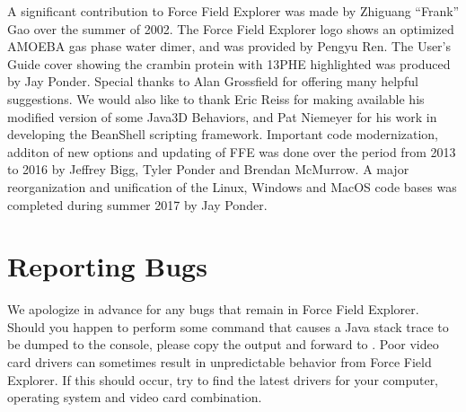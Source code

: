 \documentclass[letterpaper,11pt,english]{sphinxmanual}
\begin{document}
A significant contribution to Force Field Explorer was made by Zhiguang “Frank” Gao over the summer of 2002. The Force Field Explorer logo shows an optimized AMOEBA gas phase water dimer, and was provided by Pengyu Ren. The User’s Guide cover showing the crambin protein with 13\sphinxhyphen{}PHE highlighted was produced by Jay Ponder. Special thanks to Alan Grossfield for offering many helpful suggestions. We would also like to thank Eric Reiss for making available his modified version of some Java3D Behaviors, and Pat Niemeyer for his work in developing the BeanShell scripting framework. Important code modernization, additon of new options and updating of FFE was done over the period from 2013 to 2016 by Jeffrey Bigg, Tyler Ponder and Brendan McMurrow. A major reorganization and unification of the Linux, Windows and MacOS code bases was completed during summer 2017 by Jay Ponder.


\section{Reporting Bugs}
\label{\detokenize{text/acknowledgements:reporting-bugs}}
We apologize in advance for any bugs that remain in Force Field Explorer. Should you happen to perform some command that causes a Java stack trace to be dumped to the console, please copy the output and forward to . Poor video card drivers can sometimes result in unpredictable behavior from Force Field Explorer. If this should occur, try to find the latest drivers for your computer, operating system and video card combination.



\renewcommand{\indexname}{Index}
\printindex
\end{document}
